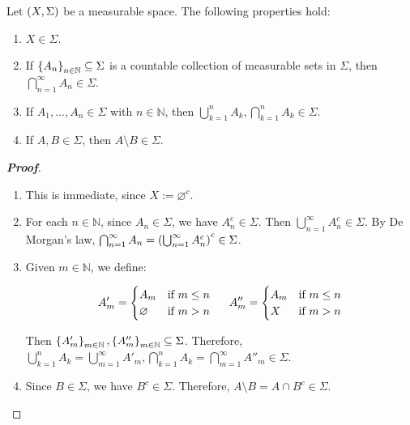 \begin{proposition}
  Let $\left(X,\Sigma\right)$ be a measurable space. The following properties hold:

  \begin{enumerate}
    \item $X\in\Sigma$.
    \item If $\left\{A_n\right\}_{n\in\mathbb{N}}\subseteq\Sigma$ is a countable collection of measurable sets in $\Sigma$, then $\bigcap_{n=1}^{\infty}{A_n}\in\Sigma$.
    \item If $A_1,\dots,A_n\in\Sigma$ with $n\in\mathbb{N}$, then $\bigcup_{k=1}^{n}{A_k},\bigcap_{k=1}^{n}{A_k}\in\Sigma$.
    \item If $A,B\in\Sigma$, then $A\setminus B\in\Sigma$.
  \end{enumerate}
  \begin{proof}[\rm\textbf{Proof}]
    \hfill
    \begin{enumerate}
      \item This is immediate, since $X:=\varnothing^c$.
      \item For each $n\in\mathbb{N}$, since $A_n\in\Sigma$, we have $A_n^c\in\Sigma$. Then $\bigcup_{n=1}^{\infty}{A_n^c}\in\Sigma$. By De Morgan's law, $\bigcap_{n=1}^{\infty}{A_n}=\left(\bigcup_{n=1}^{\infty}{A_n^c}\right)^c\in\Sigma$.
      \item Given $m\in\mathbb{N}$, we define:
      
      \begin{equation}
        A'_m=\begin{cases}
          A_m & \text{if $m\leq n$}\\
          \varnothing & \text{if $m>n$}
        \end{cases}\hspace{0.5cm}A''_m=\begin{cases}
          A_m & \text{if $m\leq n$}\\
          X & \text{if $m>n$}
        \end{cases}
      \end{equation}

      Then $\left\{A'_m\right\}_{m\in\mathbb{N}},\left\{A''_m\right\}_{m\in\mathbb{N}}\subseteq\Sigma$. Therefore, $\bigcup_{k=1}^{n}{A_k}=\bigcup_{m=1}^{\infty}{A'_m},\bigcap_{k=1}^{n}{A_k}=\bigcap_{m=1}^{\infty}{A''_m}\in\Sigma$.
      \item Since $B\in\Sigma$, we have $B^c\in\Sigma$. Therefore, $A\setminus B=A\cap B^c\in\Sigma$.
    \end{enumerate}
  \end{proof}
\end{proposition}

